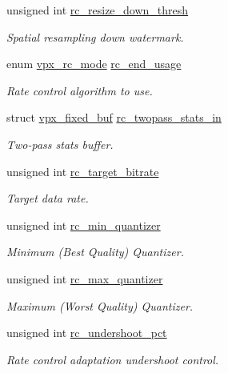 \begin{DoxyCompactItemize}
unsigned int \hyperlink{structvpx__codec__enc__cfg_a1be7bd7b0eaf1e99b5e4028c37c65488}{rc\+\_\+resize\+\_\+down\+\_\+thresh}
\begin{DoxyCompactList}\small\item\em Spatial resampling down watermark. \end{DoxyCompactList}\item 
enum \hyperlink{group__encoder_gaf50e74d91be4cae6f70dfeba5b7410d2}{vpx\+\_\+rc\+\_\+mode} \hyperlink{structvpx__codec__enc__cfg_a99c415edb6c6f909a095a57c3430a116}{rc\+\_\+end\+\_\+usage}
\begin{DoxyCompactList}\small\item\em Rate control algorithm to use. \end{DoxyCompactList}\item 
struct \hyperlink{structvpx__fixed__buf}{vpx\+\_\+fixed\+\_\+buf} \hyperlink{structvpx__codec__enc__cfg_a618616a07d9d8883c544731957b56f3c}{rc\+\_\+twopass\+\_\+stats\+\_\+in}
\begin{DoxyCompactList}\small\item\em Two-\/pass stats buffer. \end{DoxyCompactList}\item 
unsigned int \hyperlink{structvpx__codec__enc__cfg_ab8339685175d66710f482706cc9f0aed}{rc\+\_\+target\+\_\+bitrate}
\begin{DoxyCompactList}\small\item\em Target data rate. \end{DoxyCompactList}\item 
unsigned int \hyperlink{structvpx__codec__enc__cfg_a1324600e3c63faaa7717e85cf6509dd9}{rc\+\_\+min\+\_\+quantizer}
\begin{DoxyCompactList}\small\item\em Minimum (Best Quality) Quantizer. \end{DoxyCompactList}\item 
unsigned int \hyperlink{structvpx__codec__enc__cfg_a8abdd985d317b720e142335887d737df}{rc\+\_\+max\+\_\+quantizer}
\begin{DoxyCompactList}\small\item\em Maximum (Worst Quality) Quantizer. \end{DoxyCompactList}\item 
unsigned int \hyperlink{structvpx__codec__enc__cfg_ad279fbb0a9fe9395340913161e28651a}{rc\+\_\+undershoot\+\_\+pct}
\begin{DoxyCompactList}\small\item\em Rate control adaptation undershoot control. \end{DoxyCompactList}\item 

\end{DoxyCompactItemize}
